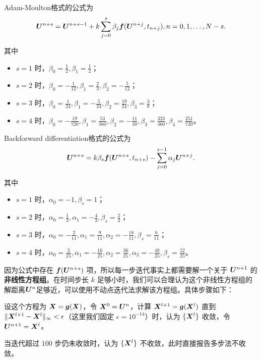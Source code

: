 \documentclass[lang=cn,a4paper,newtx,bibend=bibtex]{elegantpaper}
\begin{document}
Adam-Moulton格式的公式为
\begin{equation*}
    \bm{U}^{n+s} = \bm{U}^{n+s-1} + k\sum_{j=0}^s \beta_j\bm{f}(\bm{U}^{n+j}, t_{n+j}), n = 0, 1, \dots, N-s.
\end{equation*}

其中
\begin{itemize}
    \item $s=1$ 时，$\beta_0 = \frac 12, \beta_1 = \frac 12$；
    \item $s=2$ 时，$\beta_0 = -\frac 1{12}, \beta_1 = \frac 23, \beta_2 = -\frac 5{12}$；
    \item $s=3$ 时，$\beta_0 = \frac{1}{24}, \beta_1 = -\frac {5}{24}, \beta_2 = \frac{19}{24}, \beta_3 = \frac 38$；
    \item $s=4$ 时，$\beta_0 = -\frac {19}{720}, \beta_1 = \frac{53}{360}, \beta_2 = -\frac{11}{30}, \beta_3 = \frac{323}{360}, \beta_4 = \frac{251}{720}$。
\end{itemize}

Backforward differentiation格式的公式为
\begin{equation*}
    \bm{U}^{n+s} = k\beta_s\bm{f}(\bm{U}^{n+s}, t_{n+s}) - \sum_{j=0}^{s-1}\alpha_j\bm{U}^{n+j}.
\end{equation*}

其中
\begin{itemize}
    \item $s=1$ 时，$\alpha_0 = -1, \beta_s = 1$；
    \item $s=2$ 时，$\alpha_0 = \frac 13, \alpha_1 = -\frac 43, \beta_s = \frac 23$；
    \item $s=3$ 时，$\alpha_0 = -\frac{2}{11}, \alpha_1 = \frac{9}{11}, \alpha_2 = -\frac{18}{11}, \beta_s = \frac{6}{11}$；
    \item $s=4$ 时，$\alpha_0 = \frac{3}{25}, \alpha_1 = -\frac{16}{25}, \alpha_2 = \frac{36}{25}, \alpha_3 = -\frac{48}{25}, \beta_s = \frac{12}{25}$。
\end{itemize}

因为公式中存在 $\bm{f}(\bm{U}^{n+s})$ 项，所以每一步迭代事实上都需要解一个关于 $\bm{U}^{n+1}$ 的\textbf{非线性方程组}。在时间步长 $k$ 足够小时，我们可以合理认为这个非线性方程组的解距离$\bm{U}^n$足够近，可以使用不动点迭代法求解该方程组。具体步骤如下：

设这个方程为 $\bm{X} = \bm{g}(\bm{X})$，令 $\bm{X}^0 = \bm{U}^n$，计算 $\bm{X}^{l+1} = \bm{g}(\bm{X}^l)$ 直到 $\Vert \bm{X}^{l+1} - \bm{X}^l\Vert_\infty < \epsilon$（这里我们固定 $\epsilon = 10^{-14}$）时，认为 $\{\bm{X}^l\}$ 收敛，令 $\bm{U}^{n+1} = \bm{X}^l$。

当迭代超过 $100$ 步仍未收敛时，认为 $\{\bm{X}^l\}$ 不收敛，此时直接报告多步法不收敛。 
\end{document}
